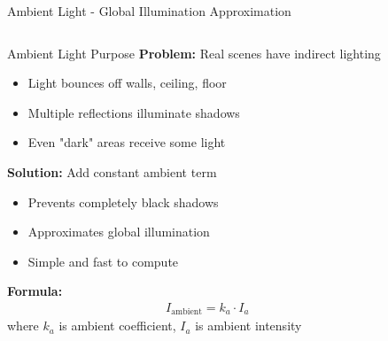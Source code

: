 
\begin{frame}{Ambient Light - Global Illumination Approximation}
  \begin{columns}
    \begin{column}{0.6\textwidth}
      \begin{raybox}{Ambient Light Purpose}
        \textbf{Problem:} Real scenes have indirect lighting
        \begin{itemize}
          \item Light bounces off walls, ceiling, floor
          \item Multiple reflections illuminate shadows
          \item Even "dark" areas receive some light
        \end{itemize}

        \vspace{0.3cm}
        \pause
        \textbf{Solution:} Add constant ambient term
        \begin{itemize}
          \item Prevents completely black shadows
          \item Approximates global illumination
          \item Simple and fast to compute
        \end{itemize}

        \vspace{0.3cm}
        \pause
        \textbf{Formula:}
        \begin{align}
          I_{\text{ambient}} = k_a \cdot I_a
        \end{align}
        where $k_a$ is ambient coefficient, $I_a$ is ambient intensity
      \end{raybox}
    \end{column}
    \begin{column}{0.4\textwidth}
    \end{column}
  \end{columns}
\end{frame}

